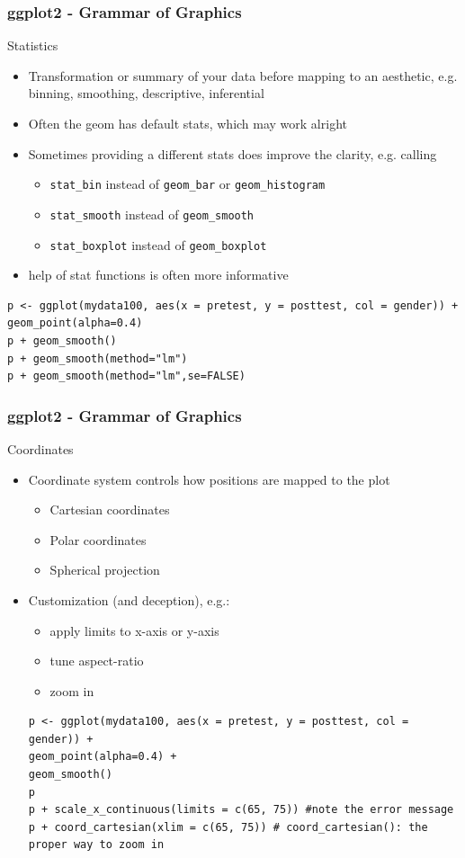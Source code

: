 \documentclass[xcolor={svgnames},10pt,
handout
]{beamer}
\begin{document}
\begin{frame}[fragile]\frametitle{ggplot2 - Grammar of Graphics}
Statistics
\begin{itemize}
	\item Transformation or summary of your data before mapping to an aesthetic, e.g. binning, smoothing, descriptive, inferential
	\item Often the geom has default stats, which may work alright
	\item Sometimes providing a different stats does improve the clarity, e.g. calling
	\begin{itemize}
		\item \lstinline|stat_bin| instead of \lstinline|geom_bar| or \lstinline|geom_histogram|
		\item \lstinline|stat_smooth| instead of \lstinline|geom_smooth|
		\item \lstinline|stat_boxplot| instead of \lstinline|geom_boxplot|
	\end{itemize}  
	\item help of stat functions is often more informative
\end{itemize}
\begin{lstlisting}
p <- ggplot(mydata100, aes(x = pretest, y = posttest, col = gender)) + 
geom_point(alpha=0.4)
p +	geom_smooth()
p + geom_smooth(method="lm")
p + geom_smooth(method="lm",se=FALSE)
\end{lstlisting}
\end{frame}

\begin{frame}[fragile]\frametitle{ggplot2 - Grammar of Graphics}
Coordinates
\begin{itemize}
	\item Coordinate system controls how positions are mapped to the plot
	\begin{itemize}
		\item Cartesian coordinates
		\item Polar coordinates
		\item Spherical projection
	\end{itemize}
	\item Customization (and deception), e.g.:
	\begin{itemize}
		\item apply limits to x-axis or y-axis
		\item tune aspect-ratio
		\item zoom in
	\end{itemize}
\begin{lstlisting}
p <- ggplot(mydata100, aes(x = pretest, y = posttest, col = gender)) +
geom_point(alpha=0.4) +
geom_smooth()
p
p + scale_x_continuous(limits = c(65, 75)) #note the error message
p + coord_cartesian(xlim = c(65, 75)) # coord_cartesian(): the proper way to zoom in
\end{lstlisting}
\end{itemize}
\end{frame}
\end{document}
